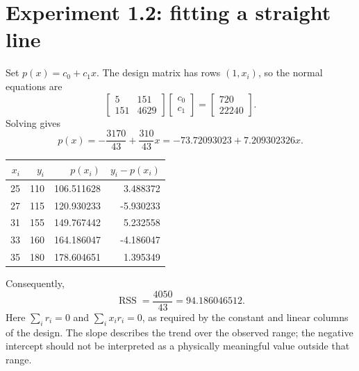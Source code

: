 \documentclass[11pt,a4paper]{article}
\newcommand{\RSS}{\operatorname{RSS}}
\begin{document}
\section{Experiment 1.2: fitting a straight line}
Set $p(x)=c_0+c_1x$. The design matrix has rows $(1,x_i)$, so the normal equations are
\[
\begin{bmatrix}5&151\\151&4629\end{bmatrix}
\begin{bmatrix}c_0\\c_1\end{bmatrix}
=\begin{bmatrix}720\\22240\end{bmatrix}.
\]
Solving gives
\[
\boxed{p(x)=-\frac{3170}{43}+\frac{310}{43}x
=-73.72093023+7.209302326x.}
\]
\begin{center}
\begin{tabular}{rrrr}\toprule
$x_i$ & $y_i$ & $p(x_i)$ & $y_i-p(x_i)$\\\midrule
25 & 110 & 106.511628 & 3.488372 \\
27 & 115 & 120.930233 & -5.930233 \\
31 & 155 & 149.767442 & 5.232558 \\
33 & 160 & 164.186047 & -4.186047 \\
35 & 180 & 178.604651 & 1.395349 \\
\bottomrule\end{tabular}
\end{center}
Consequently,
\[
\boxed{\RSS=\frac{4050}{43}=94.186046512.}
\]
Here $\sum_i r_i=0$ and $\sum_i x_i r_i=0$, as required by the constant and linear columns of the design. The slope describes the trend over the observed range; the negative intercept should not be interpreted as a physically meaningful value outside that range.
\end{document}
